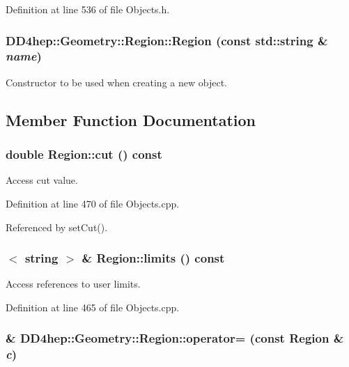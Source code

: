 Definition at line 536 of file Objects.h.\hypertarget{class_d_d4hep_1_1_geometry_1_1_region_a4856d1d3d4f373d310f3f275c99fe11d}{
\subsubsection[{Region}]{\setlength{\rightskip}{0pt plus 5cm}DD4hep::Geometry::Region::Region (const std::string \& {\em name})}}
\label{class_d_d4hep_1_1_geometry_1_1_region_a4856d1d3d4f373d310f3f275c99fe11d}


Constructor to be used when creating a new object. 

\subsection{Member Function Documentation}
\hypertarget{class_d_d4hep_1_1_geometry_1_1_region_abdf2193e4fc5f8da3a001f36338b6d4e}{
\subsubsection[{cut}]{\setlength{\rightskip}{0pt plus 5cm}double Region::cut () const}}
\label{class_d_d4hep_1_1_geometry_1_1_region_abdf2193e4fc5f8da3a001f36338b6d4e}


Access cut value. 

Definition at line 470 of file Objects.cpp.

Referenced by setCut().\hypertarget{class_d_d4hep_1_1_geometry_1_1_region_a4507ab6d77f4775c83644aa117f5ef0b}{
\subsubsection[{limits}]{$<$ {\bf string} $>$ \& Region::limits () const}}
\label{class_d_d4hep_1_1_geometry_1_1_region_a4507ab6d77f4775c83644aa117f5ef0b}


Access references to user limits. 

Definition at line 465 of file Objects.cpp.\hypertarget{class_d_d4hep_1_1_geometry_1_1_region_acd0e2208ce7854c4dead0764782cace9}{
\subsubsection[{operator=}]{\& DD4hep::Geometry::Region::operator= (const {\bf Region} \& {\em c})}}
\label{class_d_d4hep_1_1_geometry_1_1_region_acd0e2208ce7854c4dead0764782cace9}


